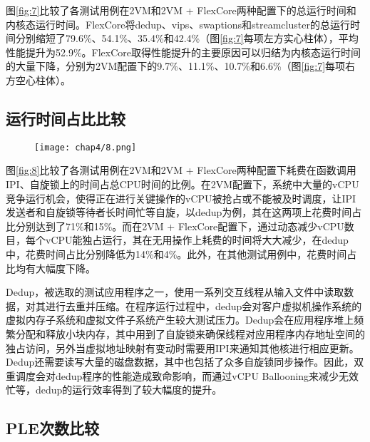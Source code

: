 图\ref{fig:7}比较了各测试用例在2VM和2VM + FlexCore两种配置下的总运行时间和内核态运行时间。FlexCore将dedup、vips、swaptions和streamcluster的总运行时间分别缩短了79.6\%、54.1\%、35.4\%和42.4\%（图\ref{fig:7}每项左方实心柱体），平均性能提升为52.9\%。FlexCore取得性能提升的主要原因可以归结为内核态运行时间的大量下降，分别为2VM配置下的9.7\%、11.1\%、10.7\%和6.6\%（图\ref{fig:7}每项右方空心柱体）。

\subsection{运行时间占比比较}

\begin{figure}[!htbp]
  \centering
  \texttt{[image: chap4/8.png]}
\end{figure}

图\ref{fig:8}比较了各测试用例在2VM和2VM + FlexCore两种配置下耗费在函数调用IPI、自旋锁上的时间占总CPU时间的比例。在2VM配置下，系统中大量的vCPU竞争运行机会，使得正在进行关键操作的vCPU被抢占或不能被及时调度，让IPI发送者和自旋锁等待者长时间忙等自旋，以dedup为例，其在这两项上花费时间占比分别达到了71\%和15\%。而在2VM + FlexCore配置下，通过动态减少vCPU数目，每个vCPU能独占运行，其在无用操作上耗费的时间将大大减少，在dedup中，花费时间占比分别降低为14\%和4\%。此外，在其他测试用例中，花费时间占比均有大幅度下降。

Dedup，被选取的测试应用程序之一，使用一系列交互线程从输入文件中读取数据，对其进行去重并压缩。在程序运行过程中，dedup会对客户虚拟机操作系统的虚拟内存子系统和虚拟文件子系统产生较大测试压力。Dedup会在应用程序堆上频繁分配和释放小块内存，其中用到了自旋锁来确保线程对应用程序内存地址空间的独占访问，另外当虚拟地址映射有变动时需要用IPI来通知其他核进行相应更新。Dedup还需要读写大量的磁盘数据，其中也包括了众多自旋锁同步操作。因此，双重调度会对dedup程序的性能造成致命影响，而通过vCPU Ballooning来减少无效忙等，dedup的运行效率得到了较大幅度的提升。



\subsection{PLE次数比较}

